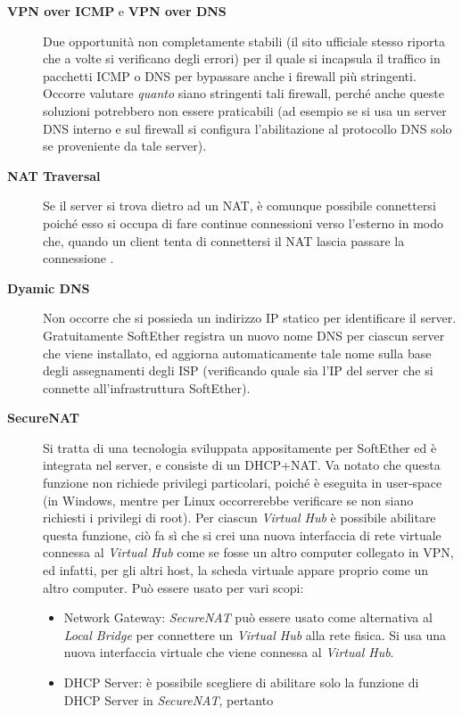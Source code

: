 \begin{description}
  \item[\textbf{VPN over ICMP} e \textbf{VPN over DNS}]Due opportunità non completamente stabili (il sito ufficiale stesso
  riporta che a volte si verificano degli errori) per il quale si incapsula il traffico in pacchetti ICMP
  o DNS per bypassare anche i firewall più stringenti. Occorre valutare \textit{quanto}
  siano stringenti tali firewall, perché anche queste soluzioni potrebbero non essere
  praticabili (ad esempio se si usa un server DNS interno e sul firewall si configura l'abilitazione
  al protocollo DNS solo se proveniente da tale server)\cite{softether-vpn-over-icmp}.
  \item[\textbf{NAT Traversal}]Se il server si trova dietro ad un NAT, è comunque possibile connettersi poiché
  esso si occupa di fare continue connessioni verso l'esterno in modo che, quando un client tenta di connettersi
  il NAT lascia passare la connessione \cite{softether-dynamic-dns-nat-trav}.
  \item[\textbf{Dyamic DNS}]Non occorre che si possieda un indirizzo IP statico per identificare il server.
  Gratuitamente SoftEther registra un nuovo nome DNS per ciascun server che viene installato, ed aggiorna
  automaticamente tale nome sulla base degli assegnamenti degli ISP (verificando quale sia l'IP
  del server che si connette all'infrastruttura SoftEther).
  \item[\textbf{SecureNAT}]Si tratta di una tecnologia sviluppata appositamente per SoftEther ed è integrata
  nel server, e consiste di un DHCP+NAT. Va notato che questa funzione non richiede privilegi particolari,
  poiché è eseguita in user-space (in Windows, mentre per Linux occorrerebbe verificare se non siano
  richiesti i privilegi di root)\cite{softether-exploit-securenat}.
  Per ciascun \textit{Virtual Hub} è possibile abilitare questa funzione, ciò fa sì che si crei
  una nuova interfaccia di rete virtuale connessa al \textit{Virtual Hub}
  come se fosse un altro computer collegato in VPN, ed infatti, per gli altri host, la scheda virtuale appare proprio
  come un altro computer. Può essere usato per vari scopi:
  \begin{itemize}
    \item Network Gateway: \textit{SecureNAT} può essere usato come alternativa al \textit{Local Bridge} per
    connettere un \textit{Virtual Hub} alla rete fisica. Si usa una nuova interfaccia virtuale che viene connessa al \textit{Virtual Hub}.
    \item DHCP Server: è possibile scegliere di abilitare solo la funzione di DHCP Server in \textit{SecureNAT}, pertanto

\end{itemize}
\end{description}
